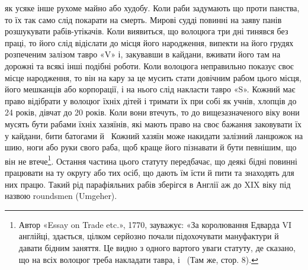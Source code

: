 \parcont{}  %
як усяке інше рухоме майно або худобу. Коли раби задумають
що проти панства, то їх так само слід покарати на смерть. Мирові
судді повинні на заяву панів розшукувати рабів-утікачів.
Коли виявиться, що волоцюга три дні тинявся без праці, то його
слід відіслати до місця його народження, випекти на його грудях
розпеченим залізом тавро «V» і, закувавши в кайдани, вживати
його там на дорожні та всякі інші подібні роботи. Коли волоцюга
неправильно показує своє місце народження, то він на кару
за це мусить стати довічним рабом цього місця, його мешканців
або корпорації, і на нього слід накласти тавро «S». Кожний
має право відібрати у волоцюг їхніх дітей і тримати їх при собі
як учнів, хлопців до 24 років, дівчат до 20 років. Коли вони втечуть,
то до вищезазначеного віку вони мусять бути рабами їхніх
хазяїнів, які мають право на своє бажання заковувати їх у
кайдани, бити батогами й~ Кожний хазяїн може накидати
залізний ланцюжок на шию, ноги або руки свого раба, щоб краще
його пізнавати й бути певнішим, що він не втече\footnote{
Автор «Essay on Trade etc.», 1770, зауважує: «За королювання
Едварда VI англійці, здається, цілком серйозно почали підохочувати
мануфактури й давати бідним заняття. Це видно з одного вартого уваги
статуту, де сказано, що на всіх волоцюг треба накладати тавра, і~
(Там же, стор. 8).
}. Остання
частина цього статуту передбачає, що деякі бідні повинні працювати
на ту округу або тих осіб, що дають їм їсти й пити та знаходять
для них працю. Такий рід парафіяльних рабів зберігся
в Англії аж до XIX віку під назвою roundsmen (Umgeher).

